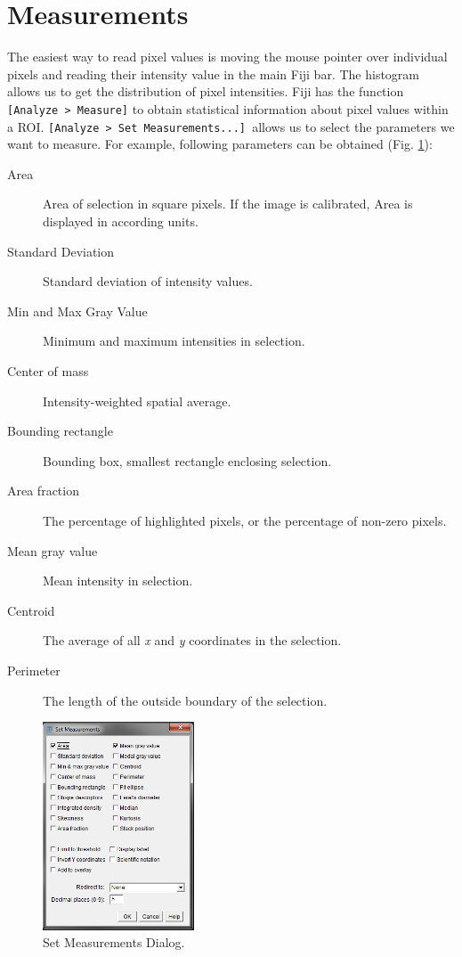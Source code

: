 \section{Measurements}

The easiest way to read pixel values is moving the mouse pointer over individual pixels and reading their intensity value in the main Fiji bar. The histogram allows us to get the distribution of pixel intensities. Fiji has the function \texttt{[Analyze > Measure]} to obtain statistical information about pixel values within a ROI. \texttt{[Analyze > Set Measurements...] }allows us to select the parameters we want to measure. For example, following parameters can be obtained (Fig. \ref{fig:set-measurements-dialog}):
\begin{description}
	\item[Area] Area of selection in square pixels. If the image is calibrated, Area is displayed in according units.
	\item[Standard Deviation] Standard deviation of intensity values.
	\item[Min and Max Gray Value] Minimum and maximum intensities in selection.
	\item[Center of mass] Intensity-weighted spatial average.
	\item[Bounding rectangle] Bounding box, smallest rectangle enclosing selection.
	\item[Area fraction] The percentage of highlighted pixels, or the percentage of non-zero pixels.
	\item[Mean gray value] Mean intensity in selection.
	\item[Centroid] The average of all \emph{x} and \emph{y} coordinates in the selection.
	\item[Perimeter] The length of the outside boundary of the selection.
\end{description}

\begin{figure}[!ht]
	\begin{center}
		\includegraphics[width=0.4\textwidth]{mod2/figures/set-measurements-dialog.png}
		\caption{Set Measurements Dialog.}\label{fig:set-measurements-dialog}
	\end{center}
\end{figure}

